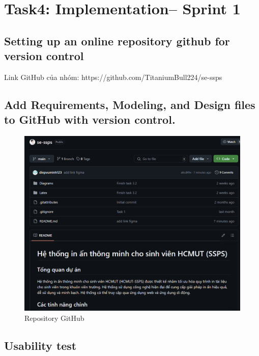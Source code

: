 \section{Task4: Implementation– Sprint 1}
\subsection{Setting up an online repository github for version control}
Link GitHub của nhóm: https://github.com/TitaniumBull224/se-ssps 
\subsection{Add Requirements, Modeling, and Design files to GitHub with version control.}
\begin{figure}[htbp]
    \centering
    \includegraphics[width=1\linewidth]{Images/Github.png}
    \caption{Repository GitHub}
\end{figure}
\subsection{Usability test}

